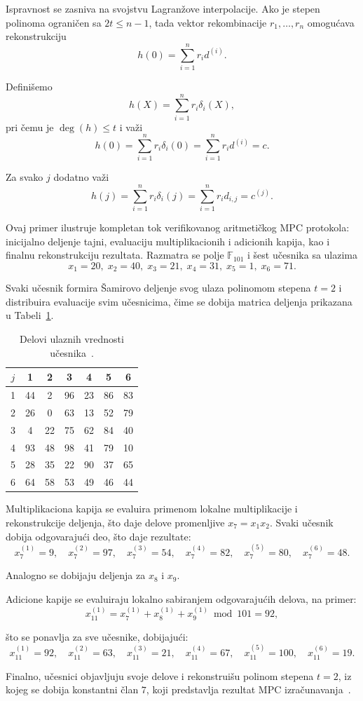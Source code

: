 Ispravnost se zasniva na svojstvu Lagranžove interpolacije. Ako je stepen polinoma ograničen sa $2t \le n-1$, tada vektor rekombinacije $r_1,\ldots,r_n$ omogućava rekonstrukciju
\[
h(0) = \sum_{i=1}^n r_i d^{(i)}.
\]

Definišemo
\[
h(X) = \sum_{i=1}^n r_i \delta_i(X),
\]
pri čemu je $\deg(h)\le t$ i važi
\[
h(0)=\sum_{i=1}^n r_i \delta_i(0)=\sum_{i=1}^n r_i d^{(i)}=c.
\]

Za svako $j$ dodatno važi
\[
h(j)=\sum_{i=1}^n r_i \delta_i(j)=\sum_{i=1}^n r_i d_{i,j}=c^{(j)}.
\]

\begin{example}
Ovaj primer ilustruje kompletan tok verifikovanog aritmetičkog MPC protokola: inicijalno deljenje tajni, evaluaciju multiplikacionih i adicionih kapija, kao i finalnu rekonstrukciju rezultata. Razmatra se polje $\mathbb{F}_{101}$ i šest učesnika sa ulazima
\[
x_1=20,\; x_2=40,\; x_3=21,\; x_4=31,\; x_5=1,\; x_6=71.
\]

Svaki učesnik formira Šamirovo deljenje svog ulaza polinomom stepena $t=2$ i distribuira evaluacije svim učesnicima, čime se dobija matrica deljenja prikazana u Tabeli~\ref{tab:input_shares}.

\begin{table}[h]
\centering
\begin{tabular}{c|cccccc}
\hline
$j$ & 1 & 2 & 3 & 4 & 5 & 6 \\
\hline
1 & 44 & 2 & 96 & 23 & 86 & 83 \\
2 & 26 & 0 & 63 & 13 & 52 & 79 \\
3 & 4 & 22 & 75 & 62 & 84 & 40 \\
4 & 93 & 48 & 98 & 41 & 79 & 10 \\
5 & 28 & 35 & 22 & 90 & 37 & 65 \\
6 & 64 & 58 & 53 & 49 & 46 & 44 \\
\hline
\end{tabular}
\caption{Delovi ulaznih vrednosti učesnika~\cite{smart2016cryptography}.}
\label{tab:input_shares}
\end{table}

Multiplikaciona kapija se evaluira primenom lokalne multiplikacije i rekonstrukcije deljenja, što daje delove promenljive $x_7 = x_1 x_2$. Svaki učesnik dobija odgovarajući deo, što daje rezultate:
\[
x_7^{(1)}=9,\quad x_7^{(2)}=97,\quad x_7^{(3)}=54,\quad x_7^{(4)}=82,\quad x_7^{(5)}=80,\quad x_7^{(6)}=48.
\]

Analogno se dobijaju deljenja za $x_8$ i $x_9$.

Adicione kapije se evaluiraju lokalno sabiranjem odgovarajućih delova, na primer:
\[
x_{11}^{(1)} = x_7^{(1)} + x_8^{(1)} + x_9^{(1)} \bmod 101 = 92,
\]

što se ponavlja za sve učesnike, dobijajući:
\[
x_{11}^{(1)}=92,\quad x_{11}^{(2)}=63,\quad x_{11}^{(3)}=21,\quad x_{11}^{(4)}=67,\quad x_{11}^{(5)}=100,\quad x_{11}^{(6)}=19.
\]

Finalno, učesnici objavljuju svoje delove i rekonstruišu polinom stepena $t=2$, iz kojeg se dobija konstantni član $7$, koji predstavlja rezultat MPC izračunavanja~\cite{smart2016cryptography}.
\end{example}

